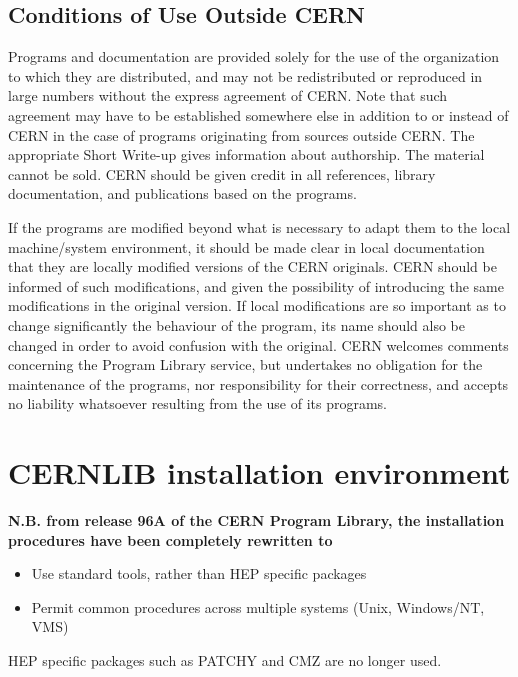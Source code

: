 \section{Conditions of Use Outside CERN}
 
Programs  and  documentation are  provided  solely  for  the  use of  the 
organization to which  they are distributed, and may not  be redistributed or
reproduced in  large numbers without the  express agreement of  CERN.  Note
that such agreement may have to be established somewhere else in addition to
or instead of CERN in the case of programs originating from sources outside
CERN.  The  appropriate Short  Write-up gives information  about authorship.
The material cannot be sold.  CERN should be given credit in all references,
library documentation, and publications based on the programs.
 
If the programs are  modified beyond what is necessary to  adapt them to the
local  machine/system  environment,  it  should   be  made  clear  in  local
documentation that they are locally modified versions of the CERN originals.
CERN should be informed of such modifications, and given the possibility of
introducing  the  same modifications  in  the  original version.   If  local
modifications are so  important as to change significantly  the behaviour of
the program, its  name should also be  changed in order to  avoid confusion
with the  original.  CERN welcomes  comments concerning the  Program Library
service, but undertakes  no obligation for the maintenance  of the programs,
nor  responsibility   for  their  correctness,  and   accepts  no  liability
whatsoever resulting from the use of its programs.
 
\chapter{CERNLIB installation environment}

{\bf N.B. from release 96A of the CERN Program Library, the installation
procedures have been completely rewritten to

\begin{itemize}
\item
Use standard tools, rather than HEP specific packages
\item
Permit common procedures across multiple systems (Unix, Windows/NT, VMS)
\end{itemize}

HEP specific packages such as PATCHY and CMZ are no longer used.

}

